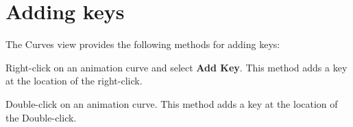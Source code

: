 \chapter{Adding keys}
\hypertarget{md__hey_tea_9_2_library_2_package_cache_2com_8unity_8timeline_0d1_87_85_2_documentation_0i_2crv__keys__add}{}\label{md__hey_tea_9_2_library_2_package_cache_2com_8unity_8timeline_0d1_87_85_2_documentation_0i_2crv__keys__add}
\label{md__hey_tea_9_2_library_2_package_cache_2com_8unity_8timeline_0d1_87_85_2_documentation_0i_2crv__keys__add_autotoc_md4636}%
%
 The Curves view provides the following methods for adding keys\+:


\begin{DoxyItemize}
\item Right-\/click on an animation curve and select {\bfseries{Add Key}}. This method adds a key at the location of the right-\/click.
\item Double-\/click on an animation curve. This method adds a key at the location of the Double-\/click. 
\end{DoxyItemize}